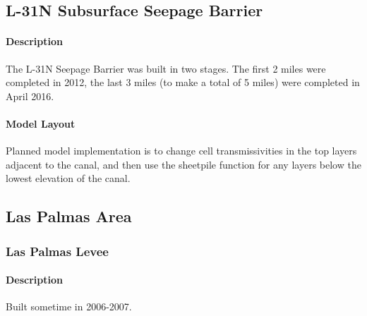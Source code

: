 \subsection{L-31N Subsurface Seepage Barrier}
\paragraph{Description}
The L-31N Seepage Barrier was built in two stages. The first 2 miles were completed in 2012, the last 3 miles (to make a total of 5 miles) were completed in April 2016.

\paragraph{Model Layout}

\begin{notes}
Planned model implementation is to change cell transmissivities in the top layers adjacent to the canal, and then use the sheetpile function for any layers below the lowest elevation of the canal.
\end{notes}

\clearpage


\subsection{Las Palmas Area}

\subsubsection{Las Palmas Levee}

\paragraph{Description}
Built sometime in 2006-2007.

